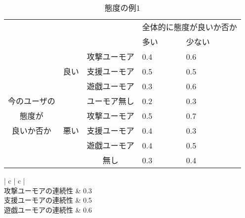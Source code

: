 \begin{table}
\begin{center}
\caption{態度の例1}
\label{tb:ex1taido}
\begin{tabular}{|c|c|c|p{6em}|p{6em}|}
\hline
\multicolumn{1}{|c}{} & \multicolumn{1}{c}{} & \multicolumn{1}{c|}{} & \multicolumn{2}{c|}{全体的に態度が良いか否か} \\\cline{4-5}
\multicolumn{1}{|c}{} & \multicolumn{1}{c}{} & \multicolumn{1}{c|}{} & \hspace{2zw}多い & \hspace{1.5zw}少ない \\\hline
 &  & 攻撃ユーモア & \hspace{2.4zw}0.4 & \hspace{2.4zw}0.6 \\\cline{3-5}
 & 良い & 支援ユーモア & \hspace{2.4zw}0.5 & \hspace{2.4zw}0.5 \\\cline{3-5}
 &  & 遊戯ユーモア & \hspace{2.4zw}0.3 & \hspace{2.4zw}0.6 \\\cline{3-5}
 今のユーザの &  & ユーモア無し & \hspace{2.4zw}0.2 & \hspace{2.4zw}0.3 \\\cline{2-5}
態度が &  & 攻撃ユーモア & \hspace{2.4zw}0.5 & \hspace{2.4zw}0.7 \\\cline{3-5}
良いか否か & 悪い & 支援ユーモア & \hspace{2.4zw}0.4 & \hspace{2.4zw}0.3 \\\cline{3-5}
 &  & 遊戯ユーモア & \hspace{2.4zw}0.4 & \hspace{2.4zw}0.5 \\\cline{3-5}
 &  & 無し & \hspace{2.4zw}0.3 & \hspace{2.4zw}0.4 \\\hline
\end{tabular}
\end{center}
\end{table}

\begin{table}[tb]
\begin{center}
\caption{ユーモアの連続性の例1}
\label{tb:ex1humor}
\begin{tabular}{| c | c |}
\hline
      \\\hline
     攻撃ユーモアの連続性 & 0.3 \\\hline
     支援ユーモアの連続性 & 0.5 \\\hline
	 遊戯ユーモアの連続性 & 0.6 \\\hline
     
\end{tabular}
\end{center}
\end{table}




